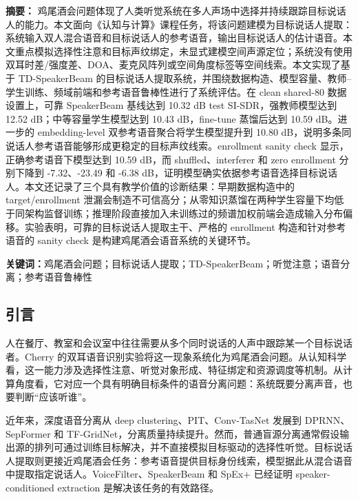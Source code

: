 \documentclass[UTF8,zihao=5,a4paper]{ctexart}
\newcommand{\sisdr}{SI-SDR}
\begin{document}
\noindent\textbf{摘要：}
鸡尾酒会问题体现了人类听觉系统在多人声场中选择并持续跟踪目标说话人的能力。本文面向《认知与计算》课程任务，将该问题建模为目标说话人提取：系统输入双人混合语音和目标说话人的参考语音，输出目标说话人的估计语音。本文重点模拟选择性注意和目标声纹绑定，未显式建模空间声源定位；系统没有使用双耳时差/强度差、DOA、麦克风阵列或空间角度标签等空间线索。本文实现了基于 TD-SpeakerBeam 的目标说话人提取系统，并围绕数据构造、模型容量、教师--学生训练、频域前端和参考语音鲁棒性进行了系统评估。在 clean shared-80 数据设置上，可靠 SpeakerBeam 基线达到 10.32 dB test \sisdr{}，强教师模型达到 12.52 dB；中等容量学生模型达到 10.43 dB，fine-tune 蒸馏后达到 10.59 dB。进一步的 embedding-level 双参考语音聚合将学生模型提升到 10.80 dB，说明多条同说话人参考语音能够形成更稳定的目标声纹线索。enrollment sanity check 显示，正确参考语音下模型达到 10.59 dB，而 shuffled、interferer 和 zero enrollment 分别下降到 -7.32、-23.49 和 -6.38 dB，证明模型确实依据参考语音选择目标说话人。本文还记录了三个具有教学价值的诊断结果：早期数据构造中的 target/enrollment 泄漏会制造不可信高分；从零知识蒸馏在两种学生容量下均低于同架构监督训练；推理阶段直接加入未训练过的频谱加权前端会造成输入分布偏移。实验表明，可靠的目标说话人提取主干、严格的 enrollment 构造和针对参考语音的 sanity check 是构建鸡尾酒会语音系统的关键环节。

\noindent\textbf{关键词：}鸡尾酒会问题；目标说话人提取；TD-SpeakerBeam；听觉注意；语音分离；参考语音鲁棒性

\subsection{引言}

人在餐厅、教室和会议室中往往需要从多个同时说话的人声中跟踪某一个目标说话者。Cherry 的双耳语音识别实验将这一现象系统化为鸡尾酒会问题\cite{cherry1953}。从认知科学看，这一能力涉及选择性注意、听觉对象形成、特征绑定和资源调度等机制\cite{broadbent1958,bregman1990}。从计算角度看，它对应一个具有明确目标条件的语音分离问题：系统既要分离声音，也要判断“应该听谁”。

近年来，深度语音分离从 deep clustering\cite{hershey2016deep}、PIT\cite{yu2017pit}、Conv-TasNet\cite{luo2019convtasnet} 发展到 DPRNN\cite{luo2020dprnn}、SepFormer\cite{subakan2021sepformer} 和 TF-GridNet\cite{wang2023tfgridnet}，分离质量持续提升。然而，普通盲源分离通常假设输出源的排列可通过训练目标解决，并不直接模拟目标驱动的选择性听觉。目标说话人提取则更接近鸡尾酒会任务：参考语音提供目标身份线索，模型据此从混合语音中提取指定说话人。VoiceFilter、SpeakerBeam 和 SpEx+ 已经证明 speaker-conditioned extraction 是解决该任务的有效路径\cite{wang2019voicefilter,zmolikova2019speakerbeam,ge2020spexplus}。
\end{document}
